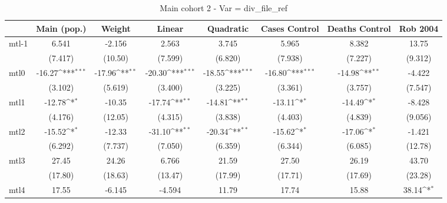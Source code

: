 \documentclass{article}
\begin{document}
{
\def\sym#1{\ifmmode^{#1}\else\(^{#1}\)\fi}
\begin{longtable}{l*{7}{c}}
\caption{Main cohort 2 - Var = div\_file\_ref}\\
\hline\hline\endfirsthead\hline\endhead\hline\endfoot\endlastfoot
                &\multicolumn{1}{c}{Main (pop.)}&\multicolumn{1}{c}{Weight}&\multicolumn{1}{c}{Linear}&\multicolumn{1}{c}{Quadratic}&\multicolumn{1}{c}{Cases Control}&\multicolumn{1}{c}{Deaths Control}&\multicolumn{1}{c}{Rob 2004}\\
\hline
mtl-1           &    6.541         &   -2.156         &    2.563         &    3.745         &    5.965         &    8.382         &    13.75         \\
                &  (7.417)         &  (10.50)         &  (7.599)         &  (6.820)         &  (7.938)         &  (7.227)         &  (9.312)         \\
mtl0            &   -16.27\sym{***}&   -17.96\sym{**} &   -20.30\sym{***}&   -18.55\sym{***}&   -16.80\sym{***}&   -14.98\sym{**} &   -4.422         \\
                &  (3.102)         &  (5.619)         &  (3.400)         &  (3.225)         &  (3.361)         &  (3.757)         &  (7.547)         \\
mtl1            &   -12.78\sym{*}  &   -10.35         &   -17.74\sym{**} &   -14.81\sym{**} &   -13.11\sym{*}  &   -14.49\sym{*}  &   -8.428         \\
                &  (4.176)         &  (12.05)         &  (4.315)         &  (3.838)         &  (4.403)         &  (4.839)         &  (9.056)         \\
mtl2            &   -15.52\sym{*}  &   -12.33         &   -31.10\sym{**} &   -20.34\sym{**} &   -15.62\sym{*}  &   -17.06\sym{*}  &   -1.421         \\
                &  (6.292)         &  (7.737)         &  (7.050)         &  (6.359)         &  (6.344)         &  (6.085)         &  (12.78)         \\
mtl3            &    27.45         &    24.26         &    6.766         &    21.59         &    27.50         &    26.19         &    43.70         \\
                &  (17.80)         &  (18.63)         &  (13.47)         &  (17.99)         &  (17.71)         &  (17.69)         &  (23.28)         \\
mtl4            &    17.55         &   -6.145         &   -4.594         &    11.79         &    17.74         &    15.88         &    38.14\sym{*}  \\

\end{longtable}}
\end{document}
